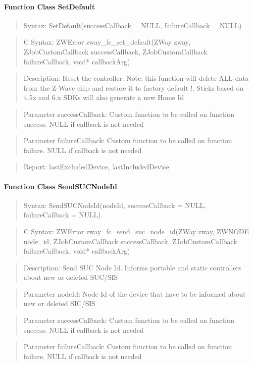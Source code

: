 \paragraph{Function Class SetDefault}
\begin{quote}Syntax: SetDefault(successCallback = NULL, failureCallback = NULL)\end{quote}
\begin{quote}C Syntax: ZWError zway\_fc\_set\_default(ZWay zway, ZJobCustomCallback successCallback, ZJobCustomCallback failureCallback, void* callbackArg)\end{quote}
\begin{quote}Description: Reset the controller. Note: this function will delete ALL data from the Z-Wave chip and restore it to factory default !. Sticks based on 4.5x and 6.x SDKs will also generate a new Home Id\end{quote}
\begin{quote}Parameter successCallback: Custom function to be called on function success. NULL if callback is not needed\end{quote}
\begin{quote}Parameter failureCallback: Custom function to be called on function failure. NULL if callback is not needed\end{quote}
\begin{quote}Report: lastExcludedDevice, lastIncludedDevice\end{quote}

\paragraph{Function Class SendSUCNodeId}
\begin{quote}Syntax: SendSUCNodeId(nodeId, successCallback = NULL, failureCallback = NULL)\end{quote}
\begin{quote}C Syntax: ZWError zway\_fc\_send\_suc\_node\_id(ZWay zway, ZWNODE node\_id, ZJobCustomCallback successCallback, ZJobCustomCallback failureCallback, void* callbackArg)\end{quote}
\begin{quote}Description: Send SUC Node Id. Informs portable and static controllers about new or deleted SUC/SIS\end{quote}
\begin{quote}Parameter nodeId: Node Id of the device that have to be informed about new or deleted SIC/SIS\end{quote}
\begin{quote}Parameter successCallback: Custom function to be called on function success. NULL if callback is not needed\end{quote}
\begin{quote}Parameter failureCallback: Custom function to be called on function failure. NULL if callback is not needed\end{quote}


